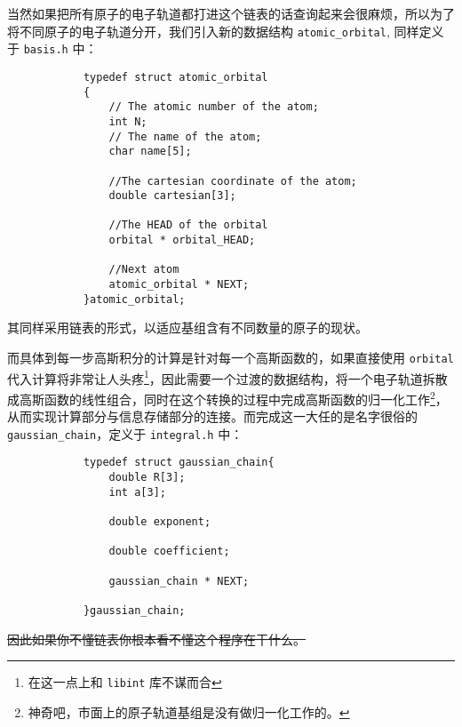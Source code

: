 \documentclass[12pt,a4paper,openany,twoside]{article}
\numberwithin{equation}{section}
\begin{document}
        当然如果把所有原子的电子轨道都打进这个链表的话查询起来会很麻烦，所以为了将不同原子的电子轨道分开，我们引入新的数据结构 \lstinline$atomic_orbital$, 同样定义于 \lstinline$basis.h$ 中：
        \begin{lstlisting}
            typedef struct atomic_orbital
            {
                // The atomic number of the atom;
                int N;
                // The name of the atom;
                char name[5];

                //The cartesian coordinate of the atom;
                double cartesian[3];

                //The HEAD of the orbital
                orbital * orbital_HEAD;

                //Next atom
                atomic_orbital * NEXT;
            }atomic_orbital;
        \end{lstlisting}
        其同样采用链表的形式，以适应基组含有不同数量的原子的现状。

        而具体到每一步高斯积分的计算是针对每一个高斯函数的，如果直接使用 \lstinline$orbital$ 代入计算将非常让人头疼\footnote{在这一点上和 \lstinline$libint$ 库不谋而合}，因此需要一个过渡的数据结构，将一个电子轨道拆散成高斯函数的线性组合，同时在这个转换的过程中完成高斯函数的归一化工作\footnote{神奇吧，市面上的原子轨道基组是没有做归一化工作的。}，从而实现计算部分与信息存储部分的连接。而完成这一大任的是名字很俗的 \lstinline$gaussian_chain$，定义于 \lstinline$integral.h$ 中：
        \begin{lstlisting}
            typedef struct gaussian_chain{
                double R[3];
                int a[3];
                
                double exponent;

                double coefficient;

                gaussian_chain * NEXT;

            }gaussian_chain;
        \end{lstlisting}
        \sout{因此如果你不懂链表你根本看不懂这个程序在干什么。}
    
\end{document}

